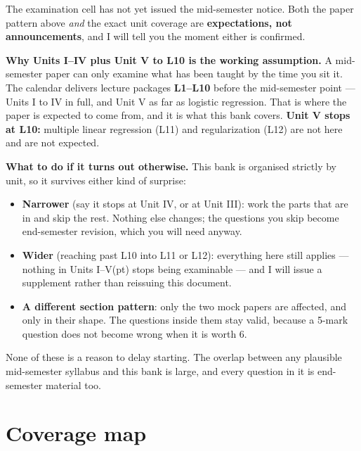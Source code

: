 \documentclass[11pt,a4paper]{article}
\begin{document}
\begin{warnbox}
The examination cell has not yet issued the mid-semester notice. Both the
paper pattern above \emph{and} the exact unit coverage are \textbf{expectations,
not announcements}, and I will tell you the moment either is confirmed.

\textbf{Why Units I--IV plus Unit V to L10 is the working assumption.} A
mid-semester paper can only examine what has been taught by the time you sit
it. The calendar delivers lecture packages \textbf{L1--L10} before the
mid-semester point --- Units I to IV in full, and Unit V as far as logistic
regression. That is where the paper is expected to come from, and it is what
this bank covers. \textbf{Unit V stops at L10:} multiple linear regression
(L11) and regularization (L12) are not here and are not expected.

\textbf{What to do if it turns out otherwise.} This bank is organised strictly
by unit, so it survives either kind of surprise:

\begin{itemize}[leftmargin=*, itemsep=0.15em]
  \item \textbf{Narrower} (say it stops at Unit IV, or at Unit III): work the
    parts that are in and skip the rest. Nothing else changes; the questions you
    skip become end-semester revision, which you will need anyway.
  \item \textbf{Wider} (reaching past L10 into L11 or L12): everything here
    still applies --- nothing in Units I--V(pt) stops being examinable --- and I
    will issue a supplement rather than reissuing this document.
  \item \textbf{A different section pattern}: only the two mock papers are
    affected, and only in their shape. The questions inside them stay valid,
    because a 5-mark question does not become wrong when it is worth 6.
\end{itemize}

None of these is a reason to delay starting. The overlap between any plausible
mid-semester syllabus and this bank is large, and every question in it is
end-semester material too.
\end{warnbox}

\section*{Coverage map}
\end{document}
